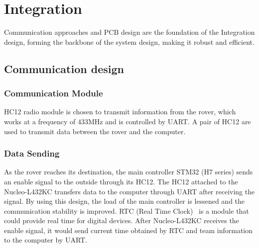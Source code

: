 \documentclass{solutionclass} %
\begin{document}
\section{Integration}
Communication approaches and PCB design are the foundation of the Integration design, forming the backbone of the system design, making it robust and efficient.

    \subsection*{Communication design}
    
        \subsubsection{Communication Module}
        HC12 radio module is chosen to transmit information from the rover, which works at a frequency of 433MHz and is controlled by UART. A pair of HC12 are used to transmit data between the rover and the computer.
        
        \subsubsection{Data Sending}
        As the rover reaches its destination, the main controller STM32 (H7 series) sends an enable signal to the outside through its HC12. The HC12 attached to the Nucleo-L432KC transfers data to the computer through UART after receiving the signal. By using this design, the load of the main controller is lessened and the communication stability is improved. RTC (Real Time Clock)~\cite{rtc} is a module that could provide real time for digital devices. After Nucleo-L432KC receives the enable signal, it would send current time obtained by RTC and team information to the computer by UART.
        
\end{document}
